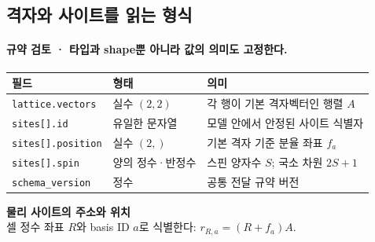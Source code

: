 \subsection{격자와 사이트를 읽는 형식}\label{site-schema}
\begingroup%
  \framesubtitle{규약 검토 · 타입과 shape뿐 아니라 값의 의미도 고정한다.}
  \begin{tabularx}{\textwidth}{@{}p{3.3cm}p{2.8cm}Y@{}}
    \toprule
    필드 & 형태 & 의미 \\
    \midrule
    \texttt{lattice.vectors} & 실수 $(2,2)$ & 각 행이 기본 격자벡터인 행렬 $A$ \\
    \texttt{sites[].id} & 유일한 문자열 & 모델 안에서 안정된 사이트 식별자 \\
    \texttt{sites[].position} & 실수 $(2,)$ & 기본 격자 기준 분율 좌표 $f_a$ \\
    \texttt{sites[].spin} & 양의 정수·반정수 & 스핀 양자수 $S$; 국소 차원 $2S+1$ \\
    \texttt{schema\_version} & 정수 & 공통 전달 규약 버전 \\
    \bottomrule
  \end{tabularx}
  \par\medskip
  \textbf{물리 사이트의 주소와 위치}\\[0.4em]
  셀 정수 좌표 $R$와 basis ID $a$로 식별한다: $r_{R,a}=(R+f_a)A$.\\[0.4em]
\endgroup


